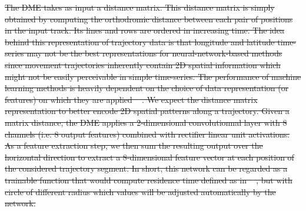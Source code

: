 \documentclass{article}
\providecommand{\DIFdeltex}[1]{{\protect\color{red}\sout{#1}}}                      %
\providecommand{\DIFdel}[1]{\texorpdfstring{\DIFdeltex{#1}}{}} %
\begin{document}
\DIFdel{The DME takes as input a distance matrix.
This distance matrix is simply obtained by computing the orthodromic distance between each pair of positions in the input track. Its lines and rows are ordered in increasing time.
The idea behind this representation of trajectory data is that longitude and latitude time-series may not be the best representations for neural-network-based methods since movement trajectories inherently contain 2D spatial information which might not be easily perceivable in simple time-series.
The performance of machine learning methods is heavily dependent on the choice of data representation (or features) on which they are applied \mbox{%
\cite{bengio_representation_2014}}\hspace{0pt}%
. We expect the distance matrix representation to better encode 2D spatial patterns along a trajectory.
Given a matrix distance, the DME applies a 2-dimensional convolutionnal layer with 8 channels (i.e. 8 output features) combined with rectifier linear unit activations.
As a feature extraction step, we then sum the resulting output over the horizontal direction to extract a 8-dimensional feature vector at each position of the considered trajectory segment.
In short, this network can be regarded as a trainable function that would compute residence time defined as in \mbox{%
\cite{barraquand_animal_2008}}\hspace{0pt}%
, but with circle of different radius which values will be adjusted automatically by the network.
}%
\end{document}
